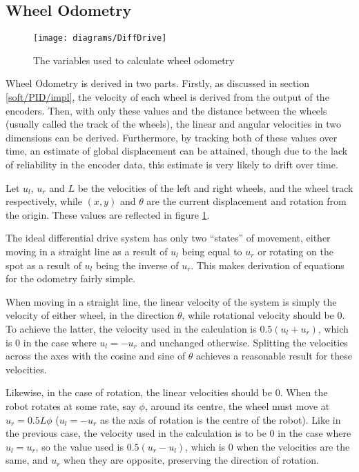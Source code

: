 \subsection{Wheel Odometry}\label{soft/odometry/wheel}

\begin{figure}[!ht]
	\centering
	\texttt{[image: diagrams/DiffDrive]}
	\caption{The variables used to calculate wheel odometry}
	\label{fig:diff_drive_diagram}
\end{figure}

Wheel Odometry is derived in two parts. Firstly, as discussed in section
\ref{soft/PID/impl}, the velocity of each wheel is derived from the output of the
encoders. Then, with only these values and the distance between the wheels
(usually called the track of the wheels), the linear and angular velocities in two
dimensions can be derived. Furthermore, by tracking both of these values over
time, an estimate of global displacement can be attained, though due to the lack
of reliability in the encoder data, this estimate is very likely to drift over
time.

Let $u_l$, $u_r$ and $L$ be the velocities of the left and right wheels, and the
wheel track respectively, while $(x, y)$ and $\theta$ are the current displacement
and rotation from the origin. These values are reflected in figure \ref{fig:diff_drive_diagram}.

The ideal differential drive system has only two ``states'' of movement, either
moving in a straight line as a result of $u_l$ being equal to $u_r$ or rotating on
the spot as a result of $u_l$ being the inverse of $u_r$. This makes derivation of
equations for the odometry fairly simple. 

When moving in a straight line, the linear velocity of the system is simply the
velocity of either wheel, in the direction $\theta$, while rotational velocity
should be $0$. To achieve the latter, the velocity used in the calculation is $0.5 (u_l + u_r)$, which is $0$ in the case where $u_l = -u_r$ and unchanged otherwise.
Splitting the velocities across the axes with the cosine and sine of $\theta$ achieves a reasonable result for these velocities.

Likewise, in the case of rotation, the linear velocities should be $0$. When the
robot rotates at some rate, say $\phi$, around its centre, the wheel must move at $u_r = 0.5 L \phi$ ($u_l = -u_r$ as the axis of rotation is the centre of the
robot). Like in the previous case, the velocity used in the calculation is to be 0
in the case where $u_l = u_r$, so the value
used is $0.5 (u_r - u_l)$, which is $0$ when the velocities are the same, and $u_r$ when they are opposite, preserving the direction of rotation. 

